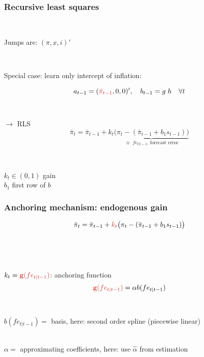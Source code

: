 \documentclass[10pt]{beamer}
\begin{document}
\begin{frame}
	\frametitle{Recursive least squares}
	\label{RLS_special}
	
	\
	
Jumps are: $(\pi, x, i)'$ 	

\
\pause
\

Special case: learn only intercept of inflation:

\begin{equation}
a_{t-1} = ( \textcolor{brownreddark}{\bar{\pi}_{t-1}},0,0)', \quad b_{t-1} = g\; h \quad \forall t
\end{equation}

\
\pause
\

$\rightarrow$ RLS
\begin{equation}
\bar{\pi}_{t}  =\bar{\pi}_{t-1} +k_t \underbrace{\big(\pi_{t} -(\bar{\pi}_{t-1}+b_1 s_{t-1}) \big)}_{\equiv \; fe_{t|t-1} \text{, forecast error} } 
\end{equation}
 
 \
 
 $k_t \in (0,1)$ gain \\
 $b_1$ first row of $b$
\vfill 

\hfill \hyperlink{RLS}{}




\end{frame}

\begin{frame}
	\frametitle{Anchoring mechanism: endogenous gain}
	\label{anchoring1}


\begin{equation}
\bar{\pi}_{t}  =\bar{\pi}_{t-1} + \textcolor{brownreddark}{k_t}\big(\pi_{t} -(\bar{\pi}_{t-1}+b_1 s_{t-1}) \big)
\end{equation}

\

\

$k_t = \textcolor{brownreddark}{\mathbf{g}(fe_{t|t-1})}$: anchoring function
\pause
\begin{equation}
 \textcolor{brownreddark}{\mathbf{g}(fe_{t|t-1})} = \alpha b(fe_{t|t-1})\label{gain}
\end{equation}

\

$ b(fe_{t|t-1}) = $ basis, here: second order spline (piecewise linear) \\

\

$\alpha  = $ approximating coefficients, here: use $\hat{\alpha}$ from estimation

\vfill 

\hfill \hyperlink{g}{}



\end{frame}
\end{document}
